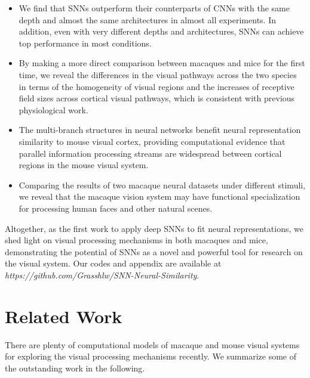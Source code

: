 \documentclass[letterpaper]{article} %
\begin{document}
\begin{itemize}
\item We find that SNNs outperform their counterparts of CNNs with the same depth and almost the same architectures in almost all experiments. In addition, even with very different depths and architectures, SNNs can achieve top performance in most conditions.
\item By making a more direct comparison between macaques and mice for the first time, we reveal the differences in the visual pathways across the two species in terms of the homogeneity of visual regions and the increases of receptive field sizes across cortical visual pathways, which is consistent with previous physiological work.
\item The multi-branch structures in neural networks benefit neural representation similarity to mouse visual cortex, providing computational evidence that parallel information processing streams are widespread between cortical regions in the mouse visual system.
\item Comparing the results of two macaque neural datasets under different stimuli, we reveal that the macaque vision system may have functional specialization for processing human faces and other natural scenes.
\end{itemize}

Altogether, as the first work to apply deep SNNs to fit neural representations, we shed light on visual processing mechanisms in both macaques and mice, demonstrating the potential of SNNs as a novel and powerful tool for research on the visual system. Our codes and appendix are available at \textit{https://github.com/Grasshlw/SNN-Neural-Similarity}.

\section{Related Work}
\label{related-work}

There are plenty of computational models of macaque and mouse visual systems for exploring the visual processing mechanisms recently. We summarize some of the outstanding work in the following.
\end{document}
